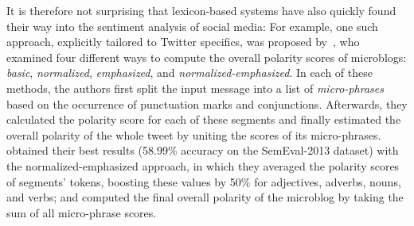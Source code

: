It is therefore not surprising that lexicon-based systems have also
quickly found their way into the sentiment analysis of social media:
For example, one such approach, explicitly tailored to Twitter
specifics, was proposed by~\citet{Musto:14}, who examined four
different ways to compute the overall polarity scores of microblogs:
\emph{basic}, \emph{normalized}, \emph{emphasized}, and
\emph{normalized-emphasized}.  %
In each of these methods, the authors first split the input message
into a list of \emph{micro-phrases} based on the occurrence of
punctuation marks and conjunctions.  Afterwards, they calculated the
polarity score for each of these segments and finally estimated the
overall polarity of the whole tweet by uniting the scores of its
micro-phrases.  \citeauthor{Musto:14} obtained their best results
(58.99\% accuracy on the SemEval-2013 dataset) with the
normalized-emphasized approach, in which they averaged the polarity
scores of segments' tokens, boosting these values by 50\% for
adjectives, adverbs, nouns, and verbs; and computed the final overall
polarity of the microblog by taking the sum of all micro-phrase
scores.


